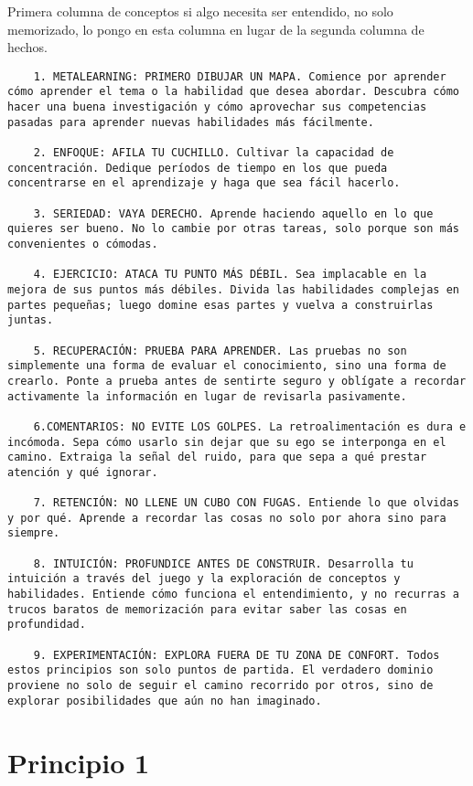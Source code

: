 Primera columna de conceptos  si algo necesita ser entendido, no solo memorizado, lo pongo en esta columna en lugar de la segunda columna de hechos.
\begin{verbatim}
	1. METALEARNING: PRIMERO DIBUJAR UN MAPA. Comience por aprender cómo aprender el tema o la habilidad que desea abordar. Descubra cómo hacer una buena investigación y cómo aprovechar sus competencias pasadas para aprender nuevas habilidades más fácilmente.
	
	2. ENFOQUE: AFILA TU CUCHILLO. Cultivar la capacidad de concentración. Dedique períodos de tiempo en los que pueda concentrarse en el aprendizaje y haga que sea fácil hacerlo. 
	
	3. SERIEDAD: VAYA DERECHO. Aprende haciendo aquello en lo que quieres ser bueno. No lo cambie por otras tareas, solo porque son más convenientes o cómodas.
	
	4. EJERCICIO: ATACA TU PUNTO MÁS DÉBIL. Sea implacable en la mejora de sus puntos más débiles. Divida las habilidades complejas en partes pequeñas; luego domine esas partes y vuelva a construirlas juntas.
	
	5. RECUPERACIÓN: PRUEBA PARA APRENDER. Las pruebas no son simplemente una forma de evaluar el conocimiento, sino una forma de crearlo. Ponte a prueba antes de sentirte seguro y oblígate a recordar activamente la información en lugar de revisarla pasivamente. 
	
	6.COMENTARIOS: NO EVITE LOS GOLPES. La retroalimentación es dura e incómoda. Sepa cómo usarlo sin dejar que su ego se interponga en el camino. Extraiga la señal del ruido, para que sepa a qué prestar atención y qué ignorar.
	
	7. RETENCIÓN: NO LLENE UN CUBO CON FUGAS. Entiende lo que olvidas y por qué. Aprende a recordar las cosas no solo por ahora sino para siempre. 
	
	8. INTUICIÓN: PROFUNDICE ANTES DE CONSTRUIR. Desarrolla tu intuición a través del juego y la exploración de conceptos y habilidades. Entiende cómo funciona el entendimiento, y no recurras a trucos baratos de memorización para evitar saber las cosas en profundidad. 
	
	9. EXPERIMENTACIÓN: EXPLORA FUERA DE TU ZONA DE CONFORT. Todos estos principios son solo puntos de partida. El verdadero dominio proviene no solo de seguir el camino recorrido por otros, sino de explorar posibilidades que aún no han imaginado. 
\end{verbatim}

\section{Principio 1}

